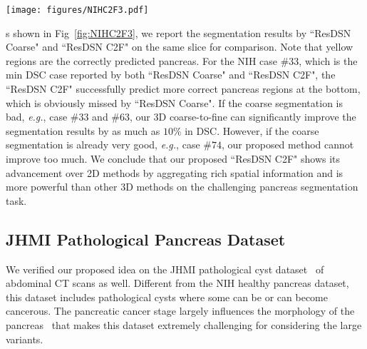 \documentclass[10pt,twocolumn,letterpaper]{article}
\begin{document}
\begin{figure*}
\centering
	\texttt{[image: figures/NIHC2F3.pdf]}
   \caption{Examples of segmentation results reported by ``ResDSN Coarse" and ``ResDSN C2F" on a same slice in the axial view from NIH case $\#33$, $\#63$ and $\#74$, respectively. Numbers after ``Coarse" or ``C2F" mean testing DSC. Red, green and yellow indicate the ground truth, prediction and overlapped regions, respectively. Best viewed in color.
}
\label{fig:NIHC2F3}
\end{figure*}

s shown in Fig~\ref{fig:NIHC2F3}, we report the segmentation results by ``ResDSN Coarse" and ``ResDSN C2F" on the same slice for comparison. Note that yellow regions are the correctly predicted pancreas. For the NIH case $\#33$, which is the min DSC case reported by both ``ResDSN Coarse" and ``ResDSN C2F", the ``ResDSN C2F" successfully predict more correct pancreas regions at the bottom, which is obviously missed by ``ResDSN Coarse". If the coarse segmentation is bad, \emph{e.g.}, case $\#33$ and $\#63$, our 3D coarse-to-fine can significantly improve the segmentation results by as much as $10\%$ in DSC. However, if the coarse segmentation is already very good, \emph{e.g.}, case $\#74$, our proposed method cannot improve too much. We conclude that our proposed ``ResDSN C2F" shows its advancement over 2D methods by aggregating rich spatial information and is more powerful than other 3D methods on the challenging pancreas segmentation task.


\subsection{JHMI Pathological Pancreas Dataset}
We verified our proposed idea on the JHMI pathological cyst dataset~\cite{zhou2017deep} of abdominal CT scans as well. Different from the NIH healthy pancreas dataset, this dataset includes pathological cysts where some can be or can become cancerous. The pancreatic cancer stage largely influences the morphology of the pancreas~\cite{lasboo2010morphological} that makes this dataset extremely challenging for considering the large variants.
\end{document}
